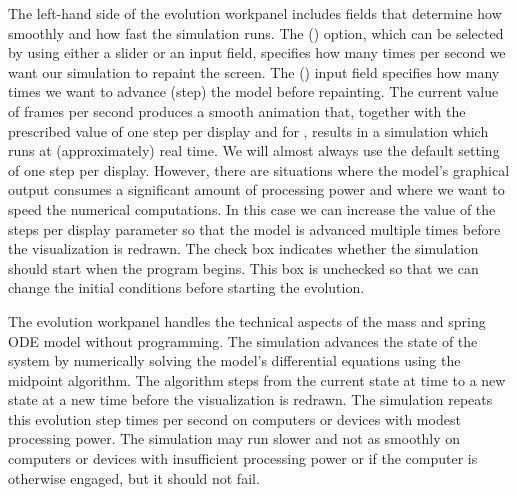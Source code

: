 The left-hand side of the evolution workpanel includes fields that determine how smoothly and how fast the simulation runs.
The  () option, which can be selected by using either a slider or an input field,
specifies how many times per second we want our simulation to repaint the screen. The 
() input field specifies how many times we want to advance (step) the model before repainting. The current
value of  frames per second produces a smooth animation that, together with the prescribed value of one step
per display and  for , results in a simulation which runs  at (approximately) real time. We will
almost always use the default setting of one step per display. However, there are situations where the model's
graphical output consumes a significant amount of processing power and where we want to speed the numerical
computations. In this case we can increase the value of the steps per display parameter so that the model is advanced
multiple times before the visualization is redrawn. The  check box indicates whether the simulation
should start when the program begins. This box is unchecked so that we can change the initial conditions before
starting the evolution.

The evolution workpanel handles the technical aspects of the mass and spring ODE model without programming.  The
simulation advances the state of the system by numerically solving the model's differential equations using the
midpoint algorithm. The algorithm steps from the current state at time  to a new state at a new time
 before the visualization is redrawn. The simulation repeats this evolution step  times per second
on computers or devices with modest processing power. The simulation may run slower and not as smoothly on computers or devices with
insufficient processing power or if the computer is otherwise engaged, but it should not fail.


